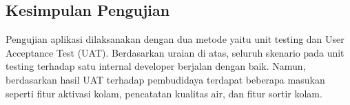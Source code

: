 \subsection {Kesimpulan Pengujian}

Pengujian aplikasi dilaksanakan dengan dua metode yaitu unit testing dan User Acceptance Test (UAT). Berdasarkan uraian di atas, seluruh skenario pada unit testing terhadap satu internal developer berjalan dengan baik. Namun, berdasarkan hasil UAT terhadap pembudidaya terdapat beberapa masukan seperti fitur aktivasi kolam, pencatatan kualitas air, dan fitur sortir kolam.




\begin{comment}

\end{comment}